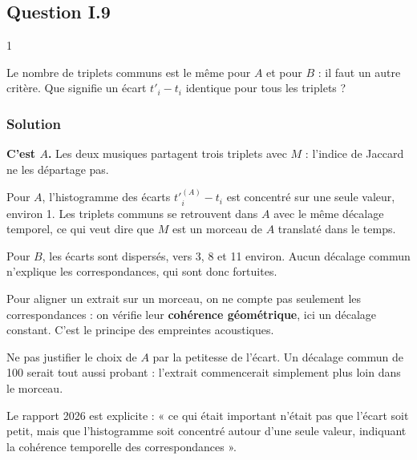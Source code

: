 \documentclass[11pt,a4paper]{article}
\begin{document}
\hypertarget{question-i.9}{%
\subsection{Question I.9}\label{question-i.9}}

\begin{indication}{1}

Le nombre de triplets communs est le même pour \(A\) et pour \(B\) : il faut un autre critère. Que signifie un écart \(t'_i-t_i\) identique pour tous les triplets ?

\end{indication}

\hypertarget{solution-8}{%
\subsubsection{Solution}\label{solution-8}}

\textbf{C'est \(A\).} Les deux musiques partagent trois triplets avec \(M\) : l'indice de Jaccard ne les départage pas.

Pour \(A\), l'histogramme des écarts \(t'^{(A)}_i-t_i\) est concentré sur une seule valeur, environ 1. Les triplets communs se retrouvent dans \(A\) avec le même décalage temporel, ce qui veut dire que \(M\) est un morceau de \(A\) translaté dans le temps.

Pour \(B\), les écarts sont dispersés, vers 3, 8 et 11 environ. Aucun décalage commun n'explique les correspondances, qui sont donc fortuites.

\begin{methode}

Pour aligner un extrait sur un morceau, on ne compte pas seulement les correspondances : on vérifie leur \textbf{cohérence géométrique}, ici un décalage constant. C'est le principe des empreintes acoustiques.

\end{methode}

\begin{piege}

Ne pas justifier le choix de \(A\) par la petitesse de l'écart. Un décalage commun de 100 serait tout aussi probant : l'extrait commencerait simplement plus loin dans le morceau.

\end{piege}

\begin{jury}

Le rapport 2026 est explicite : « ce qui était important n'était pas que l'écart soit petit, mais que l'histogramme soit concentré autour d'une seule valeur, indiquant la cohérence temporelle des correspondances ».

\end{jury}
\end{document}

